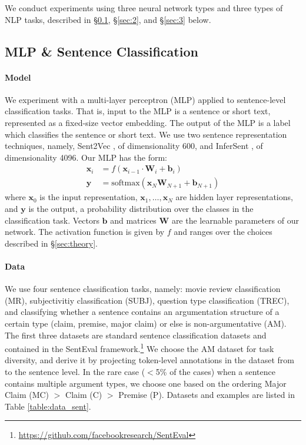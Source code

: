 We conduct experiments using three neural network types and three types of NLP tasks, described in \S\ref{sec:1}, \S\ref{sec:2}, and \S\ref{sec:3} below.
\subsection{MLP \& Sentence Classification}\label{sec:1}
\paragraph{Model}
We experiment with a multi-layer perceptron (MLP) applied to sentence-level classification tasks. That is, input to the MLP is a sentence or short text, represented as a fixed-size vector embedding. The output of the MLP is a label which classifies the sentence or short text. We use two sentence representation techniques, namely, Sent2Vec \cite{Pagliardini:2018}, of dimensionality 600, and InferSent \cite{Conneau:2017}, of dimensionality 4096. Our MLP has the form:
\begin{align*}
  \mathbf{x}_i &= f(\mathbf{x}_{i-1}\cdot \mathbf{W}_i+\mathbf{b}_i)\\
  \mathbf{y} &= \text{softmax}(\mathbf{x}_{N}\mathbf{W}_{N+1}+\mathbf{b}_{N+1})
\end{align*}
where $\mathbf{x}_0$ is the input representation, $\mathbf{x}_1,\ldots,\mathbf{x}_{N}$ are hidden layer representations, and $\mathbf{y}$ is the output, a probability distribution over the classes in the classification task. Vectors $\mathbf{b}$ and matrices $\mathbf{W}$ are the learnable parameters of our network. The activation function is given by $f$ and ranges over the choices described in \S\ref{sec:theory}. 
\paragraph{Data}
We use four sentence classification tasks, namely: movie review classification (MR), subjectivitiy classification (SUBJ), 
question type classification (TREC), 
and classifying whether a sentence contains an argumentation structure of a certain type (claim, premise, major claim) or else is non-argumentative (AM). The first three datasets are standard sentence classification datasets and contained in the SentEval framework.\footnote{\url{https://github.com/facebookresearch/SentEval}} We choose the AM dataset for task diversity, and derive %
it by projecting token-level annotations in the dataset from \citet{Stab:2017} to the sentence level. In the rare case ($<$5\% of the cases) when a sentence contains multiple argument types, we choose one based on the ordering Major Claim (MC) $>$ Claim (C) $>$ Premise (P). Datasets and examples are listed in Table \ref{table:data_sent}.

